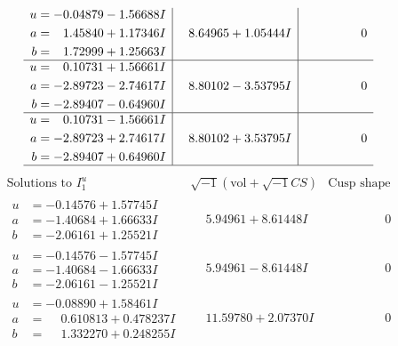 \documentclass[1p]{elsarticle_modified}
\theoremstyle{definition}
\newcommand{\I}{\sqrt{-1}}
\begin{document}
$$\begin{array}{c|c|c}
\begin{aligned}
u &= -0.04879 - 1.56688 I \\
a &= \phantom{-}1.45840 + 1.17346 I \\
b &= \phantom{-}1.72999 + 1.25663 I\end{aligned}
 & \phantom{-}8.64965 + 1.05444 I & \phantom{-0.000000 } 0 \\ \hline\begin{aligned}
u &= \phantom{-}0.10731 + 1.56661 I \\
a &= -2.89723 - 2.74617 I \\
b &= -2.89407 - 0.64960 I\end{aligned}
 & \phantom{-}8.80102 - 3.53795 I & \phantom{-0.000000 } 0 \\ \hline\begin{aligned}
u &= \phantom{-}0.10731 - 1.56661 I \\
a &= -2.89723 + 2.74617 I \\
b &= -2.89407 + 0.64960 I\end{aligned}
 & \phantom{-}8.80102 + 3.53795 I & \phantom{-0.000000 } 0\\
 \hline 
 \end{array}$$\newpage$$\begin{array}{c|c|c}  
\text{Solutions to }I^u_{1}& \I (\text{vol} + \sqrt{-1}CS) & \text{Cusp shape}\\
 \hline 
\begin{aligned}
u &= -0.14576 + 1.57745 I \\
a &= -1.40684 + 1.66633 I \\
b &= -2.06161 + 1.25521 I\end{aligned}
 & \phantom{-}5.94961 + 8.61448 I & \phantom{-0.000000 } 0 \\ \hline\begin{aligned}
u &= -0.14576 - 1.57745 I \\
a &= -1.40684 - 1.66633 I \\
b &= -2.06161 - 1.25521 I\end{aligned}
 & \phantom{-}5.94961 - 8.61448 I & \phantom{-0.000000 } 0 \\ \hline\begin{aligned}
u &= -0.08890 + 1.58461 I \\
a &= \phantom{-}0.610813 + 0.478237 I \\
b &= \phantom{-}1.332270 + 0.248255 I\end{aligned}
 & \phantom{-}11.59780 + 2.07370 I & \phantom{-0.000000 } 0 \\ \hline\begin{aligned}

\end{aligned}
\end{array}$$
\end{document}
